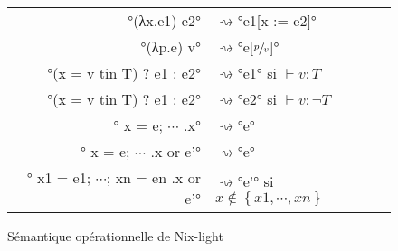 \begin{figure}
  \center
  \def\leadsto{\ensuremath{\rightsquigarrow}}
  \begin{tabular}{rl}
  °(λx.e1) e2° &\leadsto °e1[x := e2]° \\
  °(λp.e) v° &\leadsto °e[$\sfrac{p}{v}$]° \\
  °(x = v tin T) ? e1 : e2° &\leadsto °e1° \quad si $\vdash v : T$ \\
  °(x = v tin T) ? e1 : e2° &\leadsto °e2° \quad si $\vdash v : \lnot T$ \\
  °{ x = e; $\cdots$ }.x° &\leadsto °e° \\
  °{ x = e; $\cdots$ }.x or e'° &\leadsto °e° \\
  °{ x1 = e1; $\cdots$; xn = en }.x or e'° &\leadsto °e'°
      \quad si $x \notin \left\{ x1, \cdots, xn \right\}$ \\
  \end{tabular}
  \caption{Sémantique opérationnelle de Nix-light\label{nix-light::semantics}}
\end{figure}
